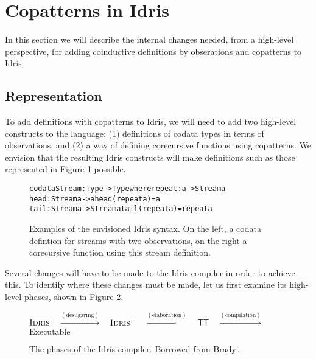 \section{Copatterns in Idris}
\label{sec:copatterns_in_idris}
In this section we will describe the internal changes needed, from a high-level perspective, for adding coinductive definitions by obserations and copatterns to Idris.

\subsection{Representation}
To add definitions with copatterns to Idris, we will need to add two high-level constructs to the language: (1) definitions of codata types in terms of observations, and (2) a way of defining corecursive functions using copatterns. We envision that the resulting Idris constructs will make definitions such as those represented in Figure \ref{fig:envisioned_copattern_syntax} possible.

\begin{figure}
\begin{alltt}
codata Stream : Type -> Type where             repeat : a -> Stream a
  head : Stream a -> a                         head (repeat a) = a
  tail : Stream a -> Stream a                  tail (repeat a) = repeat a
\end{alltt}
\caption{Examples of the envisioned Idris syntax. On the left, a codata defintion for streams with two observations, on the right a corecursive function using this stream definition.}
\label{fig:envisioned_copattern_syntax}
\end{figure}

Several changes will have to be made to the Idris compiler in order to achieve this. To identify where these changes must be made, let us first examine its high-level phases, shown in Figure \ref{fig:Idris_compiler_phases}.

\begin{figure}
\begin{center}
$\mbox{\textsc{Idris}{}}$
$\;$
$\xrightarrow{\mathrm{ (desugaring) }}$
$\;$
$\mbox{\textsc{Idris}$^-${}}$
$\;$
$\xrightarrow{\mathrm{ (elaboration) }}$
$\;$
$\mbox{\textsf{TT}{}}$
$\;$
$\xrightarrow{\mathrm{ (compilation) }}$
$\;$
$\mbox{Executable}$
\end{center}
\caption{The phases of the Idris compiler. Borrowed from Brady\,\citep{BradyIdrisImpl13}.}
\label{fig:Idris_compiler_phases}
\end{figure}

